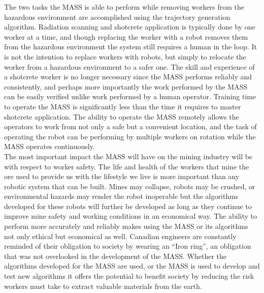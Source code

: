 The two tasks the MASS is able to perform while removing workers from the hazardous environment are accomplished using the trajectory generation algorithm. Radiation scanning and shotcrete application is typically done by one worker at a time, and though replacing the worker with a robot removes them from the hazardous environment the system still requires a human in the loop. It is not the intention to replace workers with robots, but simply to relocate the worker from a hazardous environment to a safer one. The skill and experience of a shotcrete worker is no longer necessary since the MASS performs reliably and consistently, and perhaps more importantly the work performed by the MASS can be easily verified unlike work performed by a human operator. Training time to operate the MASS is significantly less than the time it requires to master shotcrete application. The ability to operate the MASS remotely allows the operators to work from not only a safe but a convenient location, and the task of operating the robot can be performing by multiple workers on rotation while the MASS operates continuously.\\

The most important impact the MASS will have on the mining industry will be with respect to worker safety. The life and health of the workers that mine the ore used to provide us with the lifestyle we live is more important than any robotic system that can be built. Mines may collapse, robots may be crushed, or environmental hazards may render the robot inoperable but the algorithms developed for these robots will further be developed as long as they continue to improve mine safety and working conditions in an economical way. The ability to perform more accurately and reliably makes using the MASS or its algorithms not only ethical but economical as well. Canadian engineers are constantly reminded of their obligation to society by wearing an ``Iron ring'', an obligation that was not overlooked in the development of the MASS. Whether the algorithms developed for the MASS are used, or the MASS is used to develop and test new algorithms it offers the potential to benefit society by reducing the risk workers must take to extract valuable materials from the earth.\\